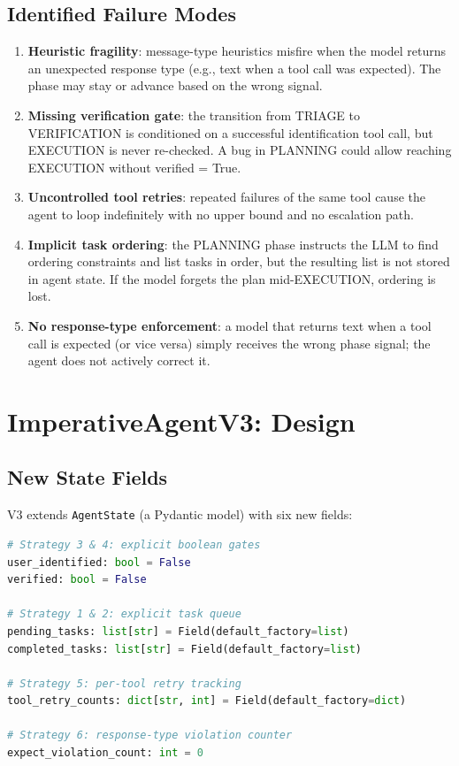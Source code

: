 \documentclass[11pt,a4paper]{article}
\begin{document}
\subsection{Identified Failure Modes}

\begin{enumerate}
  \item \textbf{Heuristic fragility}: message-type heuristics misfire when the model
    returns an unexpected response type (e.g., text when a tool call was expected).
    The phase may stay or advance based on the wrong signal.
  \item \textbf{Missing verification gate}: the transition from TRIAGE to VERIFICATION
    is conditioned on a successful identification tool call, but EXECUTION is never
    re-checked. A bug in PLANNING could allow reaching EXECUTION without verified = True.
  \item \textbf{Uncontrolled tool retries}: repeated failures of the same tool cause
    the agent to loop indefinitely with no upper bound and no escalation path.
  \item \textbf{Implicit task ordering}: the PLANNING phase instructs the LLM to find
    ordering constraints and list tasks in order, but the resulting list is not stored
    in agent state. If the model forgets the plan mid-EXECUTION, ordering is lost.
  \item \textbf{No response-type enforcement}: a model that returns text when a tool
    call is expected (or vice versa) simply receives the wrong phase signal; the agent
    does not actively correct it.
\end{enumerate}

\section{ImperativeAgentV3: Design}

\subsection{New State Fields}

V3 extends \texttt{AgentState} (a Pydantic model) with six new fields:

\begin{lstlisting}[language=Python, caption={AgentState v3 additions (src/agents/state.py)}]
# Strategy 3 & 4: explicit boolean gates
user_identified: bool = False
verified: bool = False

# Strategy 1 & 2: explicit task queue
pending_tasks: list[str] = Field(default_factory=list)
completed_tasks: list[str] = Field(default_factory=list)

# Strategy 5: per-tool retry tracking
tool_retry_counts: dict[str, int] = Field(default_factory=dict)

# Strategy 6: response-type violation counter
expect_violation_count: int = 0
\end{lstlisting}
\end{document}
